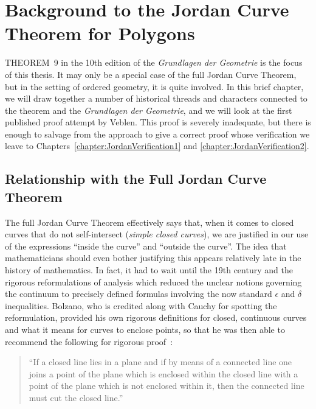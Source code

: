 \chapter{Background to the Jordan Curve Theorem for Polygons}\label{chapter:JordanInformal}
THEOREM~9 in the 10th edition of the \emph{Grundlagen der Geometrie} is the focus of this thesis. It may only be a special case of the full Jordan Curve Theorem, but in the setting of ordered geometry, it is quite involved. In this brief chapter, we will draw together a number of historical threads and characters connected to the theorem and the \emph{Grundlagen der Geometrie}, and we will look at the first published proof attempt by Veblen. This proof is severely inadequate, but there is enough to salvage from the approach to give a correct proof whose verification we leave to Chapters~\ref{chapter:JordanVerification1} and \ref{chapter:JordanVerification2}.

\section{Relationship with the Full Jordan Curve Theorem}\label{sec:JordanCurveHistory}
The full Jordan Curve Theorem effectively says that, when it comes to closed curves that do not self-intersect (\emph{simple closed curves}), we are justified in our use of the expressions ``inside the curve'' and ``outside the curve''. The idea that mathematicians should even bother justifying this appears relatively late in the history of mathematics. In fact, it had to wait until the 19th century and the rigorous reformulations of analysis which reduced the unclear notions governing the continuum to precisely defined formulas involving the now standard $\epsilon$ and $\delta$ inequalities. Bolzano, who is credited along with Cauchy for spotting the reformulation, provided his own rigorous definitions for closed, continuous curves and what it means for curves to enclose points, so that he was then able to recommend the following for rigorous proof~\cite{BolzanoJordan}:

\begin{quote}
``If a closed line lies in a plane and if by means of a connected line one joins a point of the plane which is enclosed within the closed line with a point of the plane which is not enclosed within it, then the connected line must cut the closed line.''
\end{quote}

